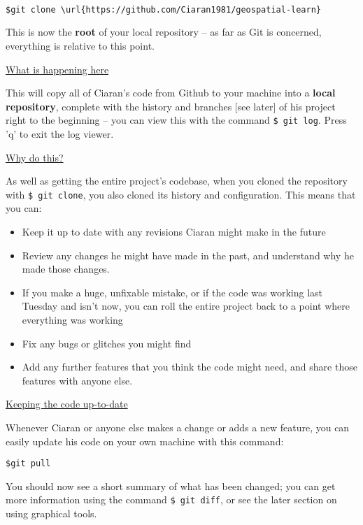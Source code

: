 \documentclass[11pt, a4paper, english]{article}
\begin{document}
\begin{verbatim}

$git clone \url{https://github.com/Ciaran1981/geospatial-learn}

\end{verbatim}

This is now the \textbf{root} of your local repository -- as far as Git is concerned, everything is relative to this point.


\underline{What is happening here}

This will copy all of Ciaran's code from Github to your machine into a \textbf{local repository}, complete with the history and branches [see later] of his project right to the beginning -- you can view this with the command \verb|$ git log|. Press 'q' to exit the log viewer.

\underline{Why do this?}

As well as getting the entire project's codebase, when you cloned the repository with \verb|$ git clone|, you also cloned its history and configuration. This means that you can:

\begin{itemize}
\item Keep it up to date with any revisions Ciaran might make in the future
\item Review any changes he might have made in the past, and understand why he made those changes.
\item If you make a huge, unfixable mistake, or if the code was working last Tuesday and isn't now, you can roll the entire project back to a point where everything was working
\item Fix any bugs or glitches you might find
\item Add any further features that you think the code might need, and share those features with anyone else.
\end{itemize}

\underline{Keeping the code up-to-date}

Whenever Ciaran or anyone else makes a change or adds a new feature, you can easily update his code on your own machine with this command:

\begin{verbatim}
$git pull
\end{verbatim}

You should now see a short summary of what has been changed; you can get more information using the command \verb|$ git diff|, or see the later section on using graphical tools.
\end{document}
